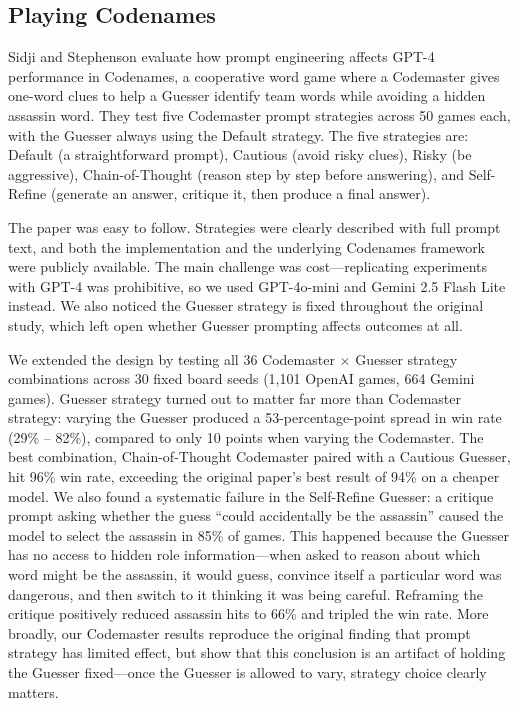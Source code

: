 \subsection{Playing Codenames}


Sidji and Stephenson evaluate how prompt engineering affects GPT-4 performance in Codenames, a cooperative word game where a Codemaster gives one-word clues to help a Guesser identify team words while avoiding a hidden assassin word. They test five Codemaster prompt strategies across 50 games each, with the Guesser always using the Default strategy. The five strategies are: Default (a straightforward prompt), Cautious (avoid risky clues), Risky (be aggressive), Chain-of-Thought (reason step by step before answering), and Self-Refine (generate an answer, critique it, then produce a final answer).

The paper was easy to follow. Strategies were clearly described with full prompt text, and both the implementation and the underlying Codenames framework were publicly available. The main challenge was cost---replicating experiments with GPT-4 was prohibitive, so we used GPT-4o-mini and Gemini 2.5 Flash Lite instead. We also noticed the Guesser strategy is fixed throughout the original study, which left open whether Guesser prompting affects outcomes at all.

We extended the design by testing all 36 Codemaster $\times$ Guesser strategy combinations across 30 fixed board seeds (1,101 OpenAI games, 664 Gemini games). Guesser strategy turned out to matter far more than Codemaster strategy: varying the Guesser produced a 53-percentage-point spread in win rate (29\% -- 82\%), compared to only 10 points when varying the Codemaster. The best combination, Chain-of-Thought Codemaster paired with a Cautious Guesser, hit 96\% win rate, exceeding the original paper's best result of 94\% on a cheaper model. We also found a systematic failure in the Self-Refine Guesser: a critique prompt asking whether the guess ``could accidentally be the assassin'' caused the model to select the assassin in 85\% of games. This happened because the Guesser has no access to hidden role information---when asked to reason about which word might be the assassin, it would guess, convince itself a particular word was dangerous, and then switch to it thinking it was being careful. Reframing the critique positively reduced assassin hits to 66\% and tripled the win rate. More broadly, our Codemaster results reproduce the original finding that prompt strategy has limited effect, but show that this conclusion is an artifact of holding the Guesser fixed---once the Guesser is allowed to vary, strategy choice clearly matters.
